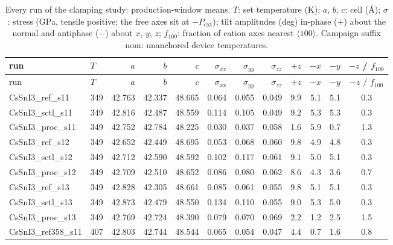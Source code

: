 \begin{landscape}
\scriptsize
\begin{longtable}{llrrrrrrrrrc}
\caption{Every run of the clamping study: production-window means. $T$: set temperature (K); $a$, $b$, $c$: cell (\si{\angstrom}); $\sigma$: stress (GPa, tensile positive; the free axes sit at $-P_\mathrm{ext}$); tilt amplitudes (deg) in-phase ($+$) about the normal and antiphase ($-$) about $x$, $y$, $z$; $f_{100}$: fraction of cation axes nearest $\langle100\rangle$. Campaign suffix nom: unanchored device temperatures. }\label{tab:si-brackets}\\
\toprule run & $T$ & $a$ & $b$ & $c$ & $\sigma_{xx}$ & $\sigma_{yy}$ & $\sigma_{zz}$ & $+z$ & $-x$ & $-y$ & $-z$ / $f_{100}$ \\ \midrule \endfirsthead
\toprule run & $T$ & $a$ & $b$ & $c$ & $\sigma_{xx}$ & $\sigma_{yy}$ & $\sigma_{zz}$ & $+z$ & $-x$ & $-y$ & $-z$ / $f_{100}$ \\ \midrule \endhead
\bottomrule \endfoot
CsSnI3\_ref\_s11 & 349 & 42.763 & 42.337 & 48.665 & 0.064 & 0.055 & 0.049 & 9.9 & 5.1 & 5.1 & 0.3 \\
CsSnI3\_sctl\_s11 & 349 & 42.816 & 42.487 & 48.559 & 0.114 & 0.105 & 0.049 & 9.2 & 5.3 & 5.3 & 0.3 \\
CsSnI3\_proc\_s11 & 349 & 42.752 & 42.784 & 48.225 & 0.030 & 0.037 & 0.058 & 1.6 & 5.9 & 0.7 & 1.3 \\
CsSnI3\_ref\_s12 & 349 & 42.652 & 42.449 & 48.695 & 0.053 & 0.068 & 0.060 & 9.8 & 4.9 & 4.8 & 0.3 \\
CsSnI3\_sctl\_s12 & 349 & 42.712 & 42.590 & 48.592 & 0.102 & 0.117 & 0.061 & 9.1 & 5.0 & 5.1 & 0.3 \\
CsSnI3\_proc\_s12 & 349 & 42.709 & 42.510 & 48.652 & 0.086 & 0.080 & 0.062 & 8.6 & 4.3 & 3.6 & 0.7 \\
CsSnI3\_ref\_s13 & 349 & 42.828 & 42.305 & 48.661 & 0.085 & 0.061 & 0.055 & 9.8 & 5.1 & 5.1 & 0.3 \\
CsSnI3\_sctl\_s13 & 349 & 42.873 & 42.479 & 48.550 & 0.134 & 0.110 & 0.055 & 9.0 & 5.3 & 5.0 & 0.3 \\
CsSnI3\_proc\_s13 & 349 & 42.769 & 42.724 & 48.390 & 0.079 & 0.070 & 0.069 & 2.2 & 1.2 & 2.5 & 1.5 \\
CsSnI3\_ref358\_s11 & 407 & 42.803 & 42.744 & 48.544 & 0.065 & 0.054 & 0.047 & 4.4 & 0.7 & 1.6 & 0.8 \\

\end{longtable}
\end{landscape}
